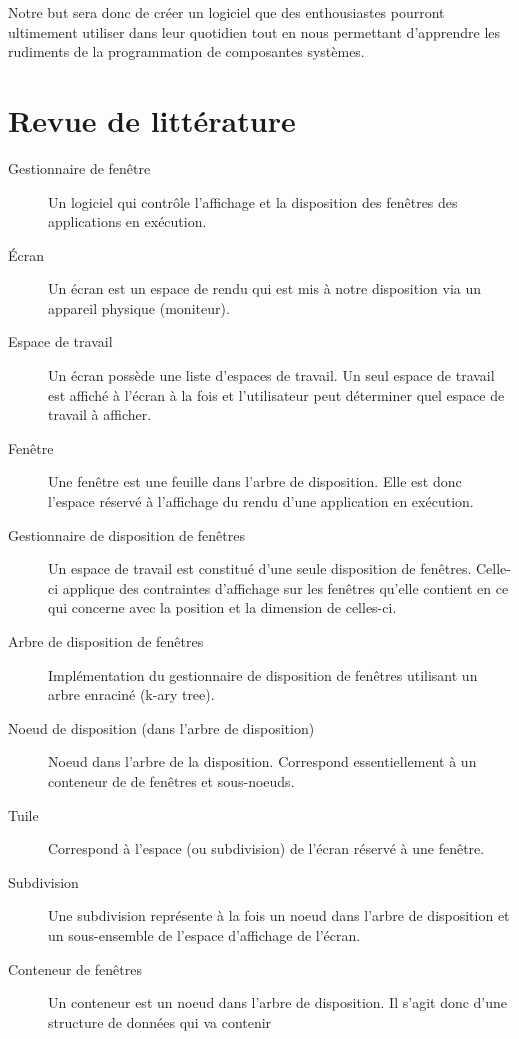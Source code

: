 \documentclass[titlepage]{article}
\begin{document}
\par
\bigskip
Notre but sera donc de créer un logiciel que des enthousiastes pourront ultimement utiliser dans leur quotidien tout en nous permettant d’apprendre les rudiments de la programmation de composantes systèmes.

\section{Revue de littérature}
\begin{description}
	\item [Gestionnaire de fenêtre] Un logiciel qui contrôle l’affichage et la
		disposition des fenêtres des applications en exécution.
	\item [Écran] Un écran est un espace de rendu qui est mis à notre
		disposition via un appareil physique (moniteur).
	\item [Espace de travail] Un écran possède une liste d’espaces de travail.
		Un seul espace de travail est affiché à l’écran à la fois et l'utilisateur peut déterminer quel espace de travail à afficher.
	\item [Fenêtre] Une fenêtre est une feuille dans l’arbre de disposition.
		Elle est donc l’espace réservé à l’affichage du rendu d’une application
		en exécution.
	\item [Gestionnaire de disposition de fenêtres]
		\begin{sloppypar}
			Un espace de travail est constitué d’une seule disposition de fenêtres. Celle-ci applique des contraintes d'affichage sur les fenêtres qu'elle contient en ce qui concerne avec la position et la dimension de celles-ci.
		\end{sloppypar}
	\item [Arbre de disposition de fenêtres] Implémentation du gestionnaire de disposition de fenêtres utilisant un arbre enraciné (k-ary tree).
	\item [Noeud de disposition (dans l’arbre de disposition)] Noeud dans
		l’arbre de la disposition. Correspond essentiellement à un conteneur de
		de fenêtres et sous-noeuds.
	\item [Tuile] Correspond à l’espace (ou subdivision) de l’écran réservé à
		une fenêtre.
	\item [Subdivision] Une subdivision représente à la fois un noeud dans
		l’arbre de disposition et un sous-ensemble de l’espace d’affichage de
		l’écran.
	\item [Conteneur de fenêtres] Un conteneur est un noeud dans l’arbre de
		disposition. Il s’agit donc d’une structure de données qui va contenir

\end{description}
\end{document}
